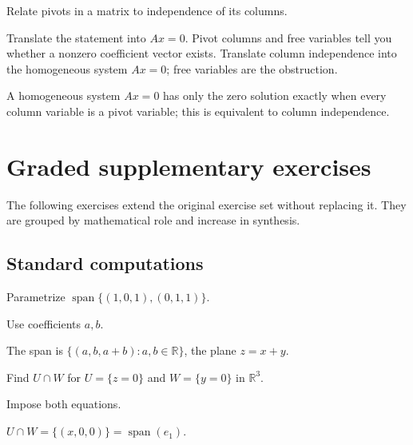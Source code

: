 \begin{exercise}\label{exr:i02-08}
Relate pivots in a matrix to independence of its columns.
\end{exercise}
\begin{hint}
Translate the statement into \(Ax=0\). Pivot columns and free variables tell you whether a nonzero coefficient vector exists. Translate column independence into the homogeneous system \(Ax=0\); free variables are the obstruction.
\end{hint}
\begin{solution}
A homogeneous system $Ax=0$ has only the zero solution exactly when every column variable is a pivot variable; this is equivalent to column independence.
\end{solution}


\section{Graded supplementary exercises}
The following exercises extend the original exercise set without replacing it. They are grouped by mathematical role and increase in synthesis.

\subsection*{Standard computations}

\begin{exercise}\label{exr:i02-expand-01}
Parametrize \(\operatorname{span}\{(1,0,1),(0,1,1)\}\).
\end{exercise}
\begin{hint}
Use coefficients \(a,b\).
\end{hint}
\begin{solution}
The span is \(\{(a,b,a+b):a,b\in\mathbb R\}\), the plane \(z=x+y\).
\end{solution}

\begin{exercise}[Intersection]\label{exr:i02-expand-02}
Find \(U\cap W\) for \(U=\{z=0\}\) and \(W=\{y=0\}\) in \(\mathbb R^3\).
\end{exercise}
\begin{hint}
Impose both equations.
\end{hint}
\begin{solution}
\(U\cap W=\{(x,0,0)\}=\operatorname{span}(e_1)\).
\end{solution}


